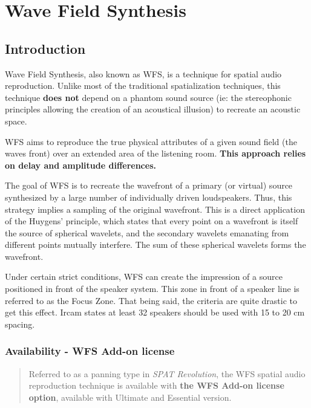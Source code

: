 \documentclass[
  letterpaper,
  DIV=11,
  numbers=noendperiod]{scrreport}
\begin{document}
\hypertarget{wave-field-synthesis}{%
\chapter{Wave Field Synthesis}\label{wave-field-synthesis}}

\hypertarget{introduction-1}{%
\section{Introduction}\label{introduction-1}}

Wave Field Synthesis, also known as WFS, is a technique for spatial
audio reproduction. Unlike most of the traditional spatialization
techniques, this technique \textbf{does not} depend on a phantom sound
source (ie: the stereophonic principles allowing the creation of an
acoustical illusion) to recreate an acoustic space.

WFS aims to reproduce the true physical attributes of a given sound
field (the waves front) over an extended area of the listening room.
\textbf{This approach relies on delay and amplitude differences.}

The goal of WFS is to recreate the wavefront of a primary (or virtual)
source synthesized by a large number of individually driven
loudspeakers. Thus, this strategy implies a sampling of the original
wavefront. This is a direct application of the Huygens' principle, which
states that every point on a wavefront is itself the source of spherical
wavelets, and the secondary wavelets emanating from different points
mutually interfere. The sum of these spherical wavelets forms the
wavefront.

Under certain strict conditions, WFS can create the impression of a
source positioned in front of the speaker system. This zone in front of
a speaker line is referred to as the Focus Zone. That being said, the
criteria are quite drastic to get this effect. Ircam states at least 32
speakers should be used with 15 to 20 cm spacing.

\hypertarget{availability---wfs-add-on-license}{%
\subsection{Availability - WFS Add-on
license}\label{availability---wfs-add-on-license}}

\begin{quote}
Referred to as a panning type in \emph{SPAT Revolution}, the WFS spatial
audio reproduction technique is available with \textbf{the WFS Add-on
license option}, available with Ultimate and Essential version.
\end{quote}
\end{document}
